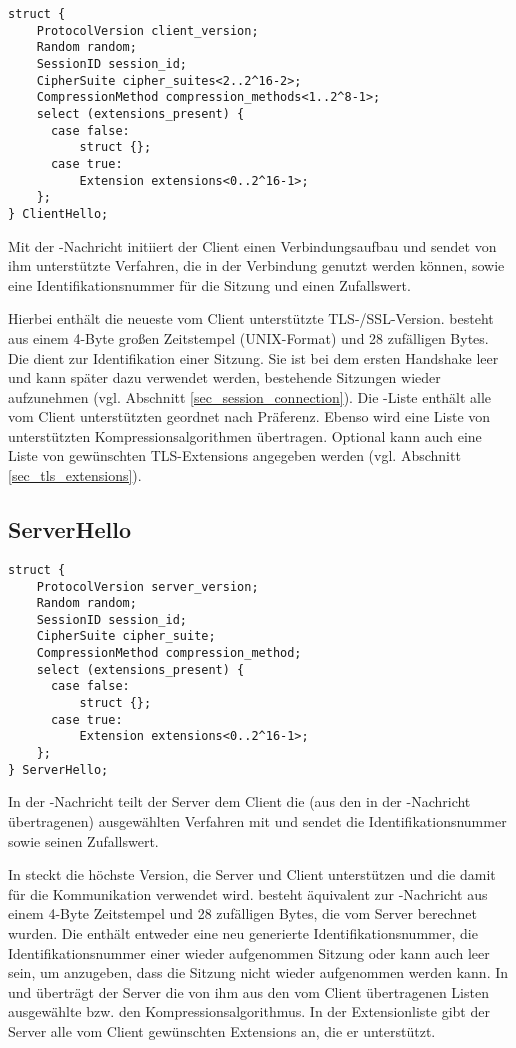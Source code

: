 \begin{lstlisting}
struct {
	ProtocolVersion client_version;
	Random random;
	SessionID session_id;
	CipherSuite cipher_suites<2..2^16-2>;
	CompressionMethod compression_methods<1..2^8-1>;
	select (extensions_present) {
	  case false:
	      struct {};
	  case true:
	      Extension extensions<0..2^16-1>;
	};
} ClientHello;
\end{lstlisting}

Mit der \clienthello{}-Nachricht initiiert der Client einen Verbindungsaufbau und sendet von ihm unterstützte Verfahren, die in der Verbindung genutzt werden können, sowie eine Identifikationsnummer für die Sitzung und einen Zufallswert.

Hierbei enthält  die neueste vom Client unterstützte TLS-/SSL-Version. 
 besteht aus einem 4-Byte großen Zeitstempel (UNIX-Format) und 28 zufälligen Bytes. 
Die  dient zur Identifikation einer Sitzung. Sie ist bei dem ersten Handshake leer und kann später dazu verwendet werden, bestehende Sitzungen wieder aufzunehmen (vgl. Abschnitt \ref{sec_session_connection}). 
Die \ciphersuite{}-Liste enthält alle vom Client unterstützten \ciphersuites{} geordnet nach Präferenz. 
Ebenso wird eine Liste von unterstützten Kompressionsalgorithmen übertragen. 
Optional kann auch eine Liste von gewünschten TLS-Extensions angegeben werden (vgl. Abschnitt \ref{sec_tls_extensions}).

\subsection{ServerHello}
\label{sec_handshake_server_hello}

\begin{lstlisting}
struct {
	ProtocolVersion server_version;
	Random random;
	SessionID session_id;
	CipherSuite cipher_suite;
	CompressionMethod compression_method;
	select (extensions_present) {
	  case false:
	      struct {};
	  case true:
	      Extension extensions<0..2^16-1>;
	};
} ServerHello;
\end{lstlisting}

In der \serverhello{}-Nachricht teilt der Server dem Client die (aus den in der \clienthello{}-Nachricht übertragenen) ausgewählten Verfahren mit und sendet die Identifikationsnummer sowie seinen Zufallswert.

In  steckt die höchste Version, die Server und Client unterstützen und die damit für die Kommunikation verwendet wird.  besteht äquivalent zur \clienthello{}-Nachricht aus einem 4-Byte Zeitstempel und 28 zufälligen Bytes, die vom Server berechnet wurden. Die  enthält entweder eine neu generierte Identifikationsnummer, die Identifikationsnummer einer wieder aufgenommen Sitzung oder kann auch leer sein, um anzugeben, dass die Sitzung nicht wieder aufgenommen werden kann. In  und  überträgt der Server die von ihm aus den vom Client übertragenen Listen ausgewählte \ciphersuite{} bzw. den Kompressionsalgorithmus. In der Extensionliste gibt der Server alle vom Client gewünschten Extensions an, die er unterstützt.

